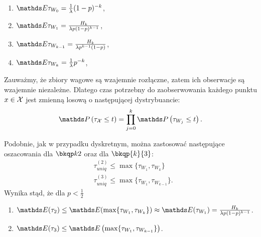 \begin{corollary}
\leavevmode
\makeatletter
\@nobreaktrue
\makeatother
\begin{enumerate}
    \item $\EE \tau_{W_0} = \frac{1}{\lambda}(1-p)^{-k}$,
    \item $\EE \tau_{W_1} = \frac{H_k}{\lambda p(1-p)^{k-1}}$,
    \item $\EE \tau_{W_{k-1}} = \frac{H_k}{\lambda p^{k-1}(1-p)}$,
    \item $\EE \tau_{W_k} = \frac{1}{\lambda}p^{-k}$,    
\end{enumerate}
\end{corollary}


\noindent
Zauważmy, że zbiory wagowe są wzajemnie rozłączne, zatem ich obserwacje są wzajemnie niezależne. Dlatego czas potrzebny do zaobserwowania każdego punktu $x\in\mathcal{X}$ jest zmienną losową o następującej dystrybuancie:
$$
\PP\left(\tau_{\set{X}}\leq t\right) = \prod\limits_{j=0}^{k} \PP\left(\tau_{W_j}\leq t\right).
$$




\noindent
Podobnie, jak w przypadku dyskretnym, można zastosować następujące oszacowania dla $\ising$ oraz dla $\bkqp{k}{3}$:
\begin{align*}
&\tau^{(2)}_{uniq} \leq \max\{\tau_{W_1},\tau_{W_k}\}\\
&\tau^{(3)}_{uniq} \leq \max\{\tau_{W_1},\tau_{W_{k-1}}\}.
\end{align*}
Wynika stąd, że dla $p<\frac12$ 
\begin{enumerate}
\item $\EE(\tau_2) \leq \EE(\max\{\tau_{W_1},\tau_{W_k}\}) \approx \EE(\tau_{W_1}) =  \frac{H_k}{\lambda p(1-p)^{k-1}}$.
\item $\EE(\tau_3) \leq \EE\left(\max\{\tau_{W_1},\tau_{W_{k-1}}\}\right)$.
\end{enumerate}



